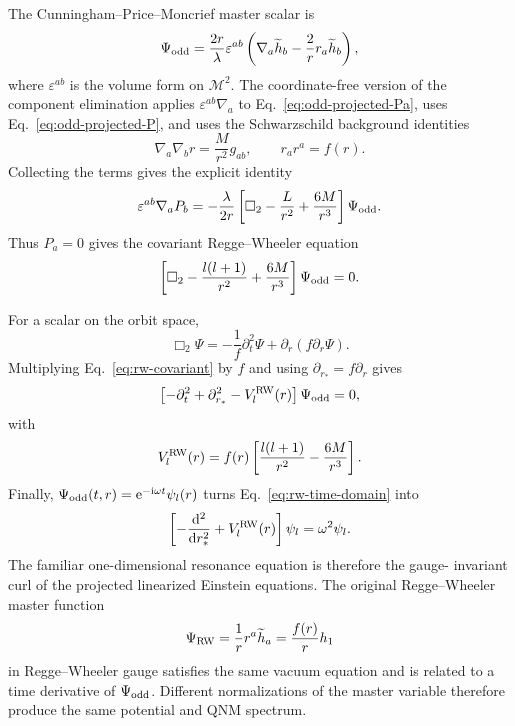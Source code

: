 The Cunningham--Price--Moncrief master scalar is
\begin{equation}
  \Psi_{\mathrm{odd}}
  =\frac{2r}{\lambda}\varepsilon^{ab}
  \left(\nabla_a\widetilde h_b
  -\frac{2}{r}r_a\widetilde h_b\right),
  \label{eq:cpm-master-variable}
\end{equation}
where $\varepsilon^{ab}$ is the volume form on $\mathcal M^2$.  The
coordinate-free version of the component elimination applies
$\varepsilon^{ab}\nabla_a$ to Eq.~\eqref{eq:odd-projected-Pa}, uses
Eq.~\eqref{eq:odd-projected-P}, and uses the Schwarzschild background
identities
\begin{equation}
  \nabla_a\nabla_b r=\frac{M}{r^2}g_{ab},
  \qquad
  r_ar^a=f(r) .
  \label{eq:schwarzschild-orbit-identities}
\end{equation}
Collecting the terms gives the explicit identity
\begin{equation}
  \varepsilon^{ab}\nabla_aP_b
  =-\frac{\lambda}{2r}
  \left[\square_2-\frac{L}{r^2}+\frac{6M}{r^3}\right]
  \Psi_{\mathrm{odd}}.
  \label{eq:rw-curl-projected-identity}
\end{equation}
Thus $P_a=0$ gives the covariant Regge--Wheeler equation
\begin{equation}
  \left[\square_2-\frac{l(l+1)}{r^2}
  +\frac{6M}{r^3}\right]\Psi_{\mathrm{odd}}=0 .
  \label{eq:rw-covariant}
\end{equation}

For a scalar on the orbit space,
\begin{equation}
  \Box_2\Psi
  =-\frac{1}{f}\partial_t^2\Psi
  +\partial_r\left(f\partial_r\Psi\right) .
  \label{eq:orbit-box-schwarzschild}
\end{equation}
Multiplying Eq.~\eqref{eq:rw-covariant} by $f$ and using
$\partial_{r_*}=f\partial_r$ gives
\begin{equation}
  \left[-\partial_t^2+\partial_{r_*}^2
  -V_l^{\mathrm{RW}}(r)\right]\Psi_{\mathrm{odd}}=0,
  \label{eq:rw-time-domain}
\end{equation}
with
\begin{equation}
  V_l^{\mathrm{RW}}(r)
  =f(r)\left[\frac{l(l+1)}{r^2}-\frac{6M}{r^3}\right] .
  \label{eq:rw-potential-derived}
\end{equation}
Finally, $\Psi_{\mathrm{odd}}(t,r)=\mathrm{e}^{-\mathrm{i}\omega t}\psi_l(r)$
turns Eq.~\eqref{eq:rw-time-domain} into
\begin{equation}
  \left[-\frac{\mathrm{d}^2}{\mathrm{d} r_*^2}
  +V_l^{\mathrm{RW}}(r)\right]\psi_l
  =\omega^2\psi_l .
  \label{eq:rw-frequency-derived}
\end{equation}
The familiar one-dimensional resonance equation is therefore the gauge-
invariant curl of the projected linearized Einstein equations.  The original
Regge--Wheeler master function
\begin{equation}
  \Psi_{\mathrm{RW}}
  =\frac{1}{r}r^a\widetilde h_a
  =\frac{f(r)}{r}h_1
  \label{eq:original-rw-master}
\end{equation}
in Regge--Wheeler gauge satisfies the same vacuum equation and is related to
a time derivative of $\Psi_{\mathrm{odd}}$.  Different normalizations of the
master variable therefore produce the same potential and QNM spectrum.

